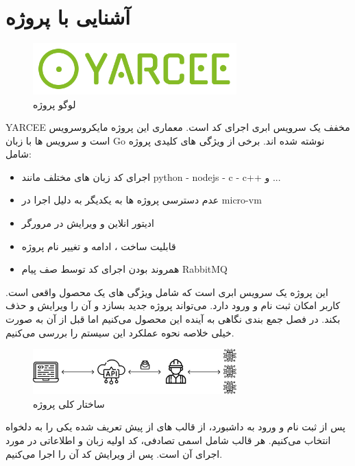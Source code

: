 \chapter{آشنایی با پروژه}

\begin{figure}[h]
    \centering
    \includegraphics[width=0.7\textwidth]{./1-Introduction/yarcee.png}
    \caption{لوگو پروژه}
    \label{fig:yarcee}
\end{figure}

YARCEE مخفف
یک سرویس ابری اجرای کد است.
معماری این پروژه مایکروسرویس است و سرویس ها با زبان Go نوشته شده اند.
برخی از ویژگی های کلیدی پروژه شامل:

\begin{itemize}
    \item اجرای کد زبان های مختلف مانند python - nodejs - c - c++ و ...
    \item عدم دسترسی پروژه ها به یکدیگر به دلیل اجرا در micro-vm
    \item ادیتور انلاین و ویرایش در مرورگر
    \item قابلیت ساخت ، ادامه و تغییر نام پروژه
    \item همروند بودن اجرای کد توسط صف پیام RabbitMQ
\end{itemize}


\newpage

این پروژه یک سرویس ابری است که شامل ویژگی های یک محصول واقعی است. کاربر امکان ثبت نام و ورود دارد.
می‌تواند پروژه جدید بسازد و آن را ویرایش و حذف بکند.
در فصل جمع بندی نگاهی به آینده این محصول می‌کنیم اما قبل از آن به صورت خیلی خلاصه نحوه عملکرد این سیستم را بررسی می‌کنیم.


\begin{figure}[htbp]
    \centering
    \includegraphics[width=0.7\textwidth]{./1-Introduction/overview.jpg}
    \caption{ساختار کلی پروژه}
    \label{fig:yarcee-overview}
\end{figure}

پس از ثبت نام و ورود به داشبورد، از قالب های از پیش تعریف شده یکی را به دلخواه انتخاب می‌کنیم. هر قالب شامل اسمی تصادفی، کد اولیه زبان و اطلاعاتی در مورد اجرای آن است.
پس از ویرایش کد آن را اجرا می‌کنیم.

